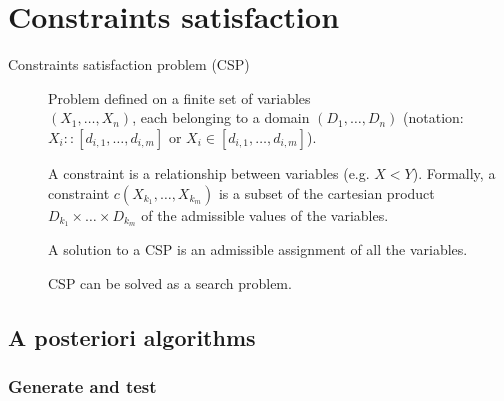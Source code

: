\chapter{Constraints satisfaction}

\begin{description}
    \item[Constraints satisfaction problem (CSP)] 
        Problem defined on a finite set of variables\\$(X_1, \dots, X_n)$,
        each belonging to a domain $(D_1, \dots, D_n)$ 
        (notation: $X_i :: [d_{i,1}, \dots, d_{i,m}]$ or $X_i \in [d_{i,1}, \dots, d_{i,m}]$).

        A constraint is a relationship between variables (e.g. $X < Y$). 
        Formally, a constraint $c(X_{k_1}, \dots, X_{k_m})$ is a subset of the cartesian product
        $D_{k_1} \times \dots \times D_{k_m}$ of the admissible values of the variables.

        A solution to a CSP is an admissible assignment of all the variables.

        CSP can be solved as a search problem.
\end{description}



\section{A posteriori algorithms}

\subsection{Generate and test}

